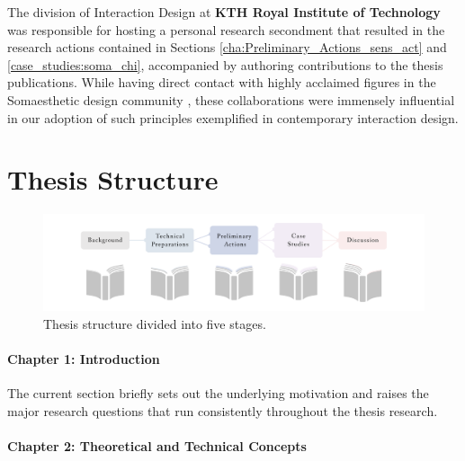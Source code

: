         The division of Interaction Design at \textbf{KTH Royal Institute of Technology} was responsible for hosting a personal research secondment that resulted in the research actions contained in Sections \ref{cha:Preliminary_Actions_sens_act} and \ref{case_studies:soma_chi}, accompanied by authoring contributions to the thesis publications. While having direct contact with highly acclaimed figures in the Somaesthetic design community \cite{hook_designing_2018}, these collaborations were immensely influential in our adoption of such principles exemplified in contemporary interaction design.

\section{Thesis Structure}
\label{sec:structure}

\begin{figure}[htbp]
	\centering
	\includegraphics[width=1.0\textwidth]{Chapters/Figures/background/Sec1_Thesis_Structure}
	\caption{Thesis structure divided into five stages.}
	\label{fig:thesis_structure}
\vspace*{-20pt}
\end{figure}

\paragraph{Chapter 1: Introduction}
The current section briefly sets out the underlying motivation and raises the major research questions that run consistently throughout the thesis research.

\paragraph{Chapter 2: Theoretical and Technical Concepts}

